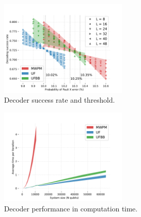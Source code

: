 \documentclass[11pt, a4paper, twoside, titlepage, usenames,dvipsnames]{report}
\begin{document}
\begin{figure}
     \centering
     \includegraphics[width=0.55\textwidth]{threshold.pdf}
     \caption{Decoder success rate and threshold.}\label{fig4}
\end{figure}

\begin{figure}
     \centering
     \includegraphics[width=0.55\textwidth]{time.pdf}
     \caption{Decoder performance in computation time.}\label{fig5}
\end{figure}
\end{document}
